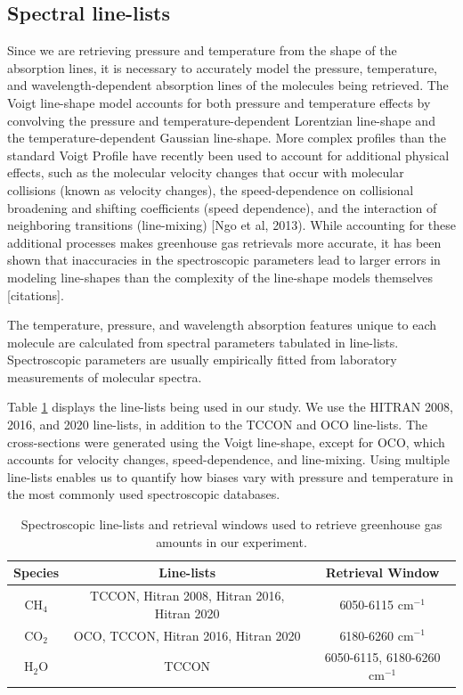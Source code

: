 \documentclass[amt, manuscript]{copernicus}
\begin{document}
\subsection{Spectral line-lists}
Since we are retrieving pressure and temperature from the shape of the absorption lines, it is necessary to accurately model the pressure, temperature, and wavelength-dependent absorption lines of the molecules being retrieved. The Voigt line-shape model accounts for both pressure and temperature effects by convolving the pressure and temperature-dependent Lorentzian line-shape and the temperature-dependent Gaussian line-shape. More complex profiles than the standard Voigt Profile have recently been used to account for additional physical effects, such as the molecular velocity changes that occur with molecular collisions (known as velocity changes), the speed-dependence on collisional broadening and shifting coefficients (speed dependence), and the interaction of neighboring transitions (line-mixing) [Ngo et al, 2013). While accounting for these additional processes makes greenhouse gas retrievals more accurate, it has been shown that inaccuracies in the spectroscopic parameters lead to larger errors in modeling line-shapes than the complexity of the line-shape models themselves [citations].

The temperature, pressure, and wavelength absorption features unique to each molecule are calculated from spectral parameters tabulated in line-lists. Spectroscopic parameters are usually empirically fitted from laboratory measurements of molecular spectra.

Table \ref{tab:1} displays the line-lists being used in our study. We use the HITRAN 2008, 2016, and 2020 line-lists, in addition to the TCCON and OCO line-lists. The cross-sections were generated using the Voigt line-shape, except for OCO, which accounts for velocity changes, speed-dependence, and line-mixing. Using multiple line-lists enables us to quantify how biases vary with pressure and temperature in the most commonly used spectroscopic databases.


\begin{table}
  \centering
  \begin{tabular}{| c | c | c |}
    Species & Line-lists & Retrieval Window \\
    \hline
    CH$_4$ & TCCON, Hitran 2008, Hitran 2016, Hitran 2020 & 6050-6115 cm$^{-1}$ \\
    CO$_2$ & OCO, TCCON, Hitran 2016, Hitran 2020 & 6180-6260 cm$^{-1}$ \\
    H$_2$O & TCCON & 6050-6115, 6180-6260 cm$^{-1}$ \\
    \hline
    
  \end{tabular}
  \caption{Spectroscopic line-lists and retrieval windows used to retrieve greenhouse gas amounts in our experiment.}
  
  \label{tab:1}
\end{table}
\end{document}
